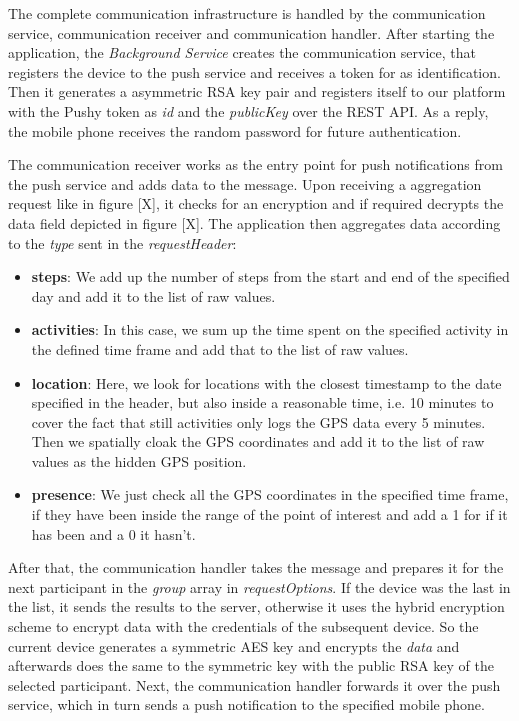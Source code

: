The complete communication infrastructure is handled by the communication service, communication receiver and communication handler. After starting the application, the \textit{Background Service} creates the communication service, that registers the device to the push service and receives a token for as identification. Then it generates a asymmetric RSA key pair and registers itself to our platform with the Pushy token as \textit{id} and the \textit{publicKey} over the REST API. As a reply, the mobile phone receives the random password for future authentication.

The communication receiver works as the entry point for push notifications from the push service and adds data to the message. Upon receiving a aggregation request like in figure [X], it checks for an encryption and if required decrypts the data field depicted in figure [X]. The application then aggregates data according to the \textit{type} sent in the \textit{requestHeader}:
\begin{itemize}
	\item \textbf{steps}: We add up the number of steps from the start and end of the specified day and add it to the list of raw values.
	\item \textbf{activities}: In this case, we sum up the time spent on the specified activity in the defined time frame and add that to the list of raw values.
	\item \textbf{location}: Here, we look for locations with the closest timestamp to the date specified in the header, but also inside a reasonable time, i.e. 10 minutes to cover the fact that still activities only logs the GPS data every 5 minutes. Then we spatially cloak the GPS coordinates and add it to the list of raw values as the hidden GPS position.
	\item \textbf{presence}: We just check all the GPS coordinates in the specified time frame, if they have been inside the range of the point of interest and add a 1 for if it has been and a 0 it hasn't.
\end{itemize}

After that, the communication handler takes the message and prepares it for the next participant in the \textit{group} array in \textit{requestOptions}. If the device was the last in the list, it sends the results to the server, otherwise it uses the hybrid encryption scheme to encrypt data with the credentials of the subsequent device. So the current device generates a symmetric AES key and encrypts the \textit{data} and afterwards does the same to the symmetric key with the public RSA key of the selected participant. Next, the communication handler forwards it over the push service, which in turn sends a push notification to the specified mobile phone.

